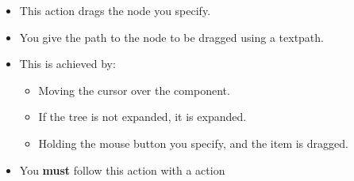 
\begin{itemize}
\item This action drags the node you specify.
\item You give the path to the node to be dragged using a textpath.
\item This is achieved by:
\begin{itemize}
\item Moving the cursor over the component.
\item If the tree is not expanded, it is expanded.
\item Holding the mouse button you specify, and the item is dragged. 
\end{itemize}
\item You \textbf{must} follow this action with a  action
\end{itemize}
